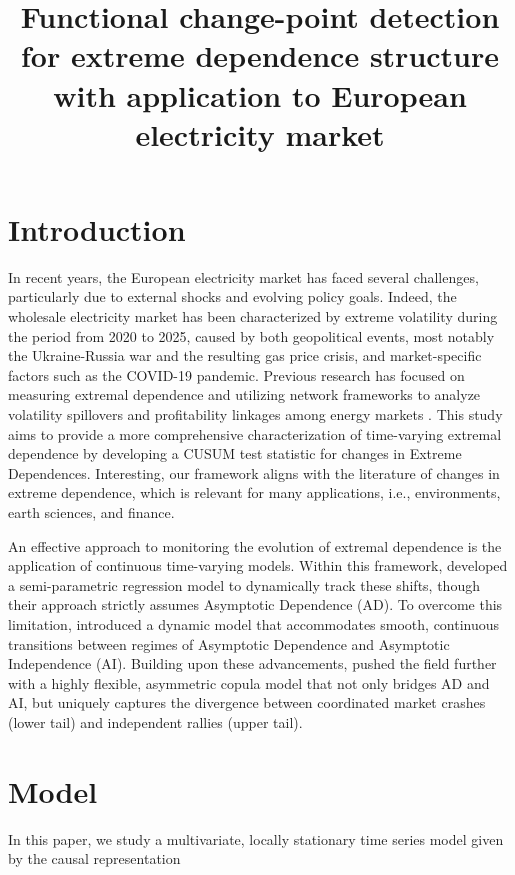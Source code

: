 \documentclass[12pt,a4paper]{article}
\title{\textbf{Functional change-point detection for extreme dependence structure with application to  European electricity market}}
\author[]{}
\date{} %
\theoremstyle{definition}
\theoremstyle{definition}
\theoremstyle{theorem}
\begin{document}
\maketitle

\begin{abstract}

\end{abstract}

\section{Introduction}
In recent years, the European electricity market has faced several challenges,
particularly due to external shocks and evolving policy goals. Indeed, the wholesale electricity market has been characterized by extreme volatility during the period from 2020 to 2025, caused by both geopolitical events,
most notably the Ukraine-Russia war and the resulting gas price crisis, and market-specific factors such as the COVID-19 pandemic.
Previous research has focused on measuring extremal dependence \cite{Lindstrom2012} and utilizing network frameworks to analyze volatility spillovers and profitability linkages among energy markets \cite{Felix2025}.
This study aims to provide a more comprehensive characterization of time-varying extremal dependence by developing a CUSUM test statistic for changes in Extreme Dependences.
Interesting, our framework aligns with the literature of changes in extreme dependence, which is relevant for many applications, i.e., environments,  earth sciences, and finance. 
 
An effective approach to monitoring the evolution of extremal dependence is the application of continuous time-varying models. Within this framework, \cite{Castro2018} developed a semi-parametric regression model to dynamically track these shifts, though their approach strictly assumes Asymptotic Dependence (AD). To overcome this limitation, \cite{Hoga2022} introduced a dynamic model that accommodates smooth, continuous transitions between regimes of Asymptotic Dependence and Asymptotic Independence (AI). Building upon these advancements, \cite{Gong2022} pushed the field further with a highly flexible, asymmetric copula model that not only bridges AD and AI, but uniquely captures the divergence between coordinated market crashes (lower tail) and independent rallies (upper tail).



\section{Model}
In this paper, we study a multivariate, locally stationary time series model given by the causal representation
\end{document}
